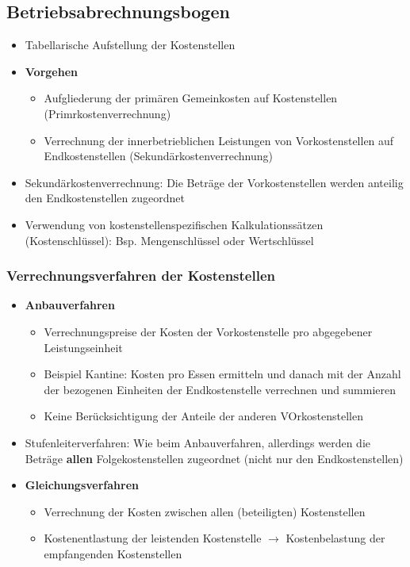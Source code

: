 \subsection{Betriebsabrechnungsbogen}
\begin{itemize}
	\item Tabellarische Aufstellung der Kostenstellen
	\item \textbf{Vorgehen}
	\begin{itemize}
		\item Aufgliederung der primären Gemeinkosten auf Kostenstellen (Primrkostenverrechnung)
		\item Verrechnung der innerbetrieblichen Leistungen von Vorkostenstellen auf Endkostenstellen (Sekundärkostenverrechnung)
	\end{itemize}
	\item Sekundärkostenverrechnung: Die Beträge der Vorkostenstellen werden anteilig den Endkostenstellen zugeordnet
	\item Verwendung von kostenstellenspezifischen Kalkulationssätzen (Kostenschlüssel): Bsp. Mengenschlüssel oder Wertschlüssel
\end{itemize}

\subsubsection{Verrechnungsverfahren der Kostenstellen}
\begin{itemize}
	\item \textbf{Anbauverfahren}
	\begin{itemize}
		\item Verrechnungspreise der Kosten der Vorkostenstelle pro abgegebener Leistungseinheit
		\item Beispiel Kantine: Kosten pro Essen ermitteln und danach mit der Anzahl der bezogenen Einheiten der Endkostenstelle verrechnen und summieren
		\item Keine Berücksichtigung der Anteile der anderen VOrkostenstellen
	\end{itemize}
	\item Stufenleiterverfahren: Wie beim Anbauverfahren, allerdings werden die Beträge \textbf{allen} Folgekostenstellen zugeordnet (nicht nur den Endkostenstellen)
	\item \textbf{Gleichungsverfahren}
	\begin{itemize}
		\item Verrechnung der Kosten zwischen allen (beteiligten) Kostenstellen
		\item Kostenentlastung der leistenden Kostenstelle \(\rightarrow\) Kostenbelastung der empfangenden Kostenstellen
	\end{itemize}
\end{itemize}



